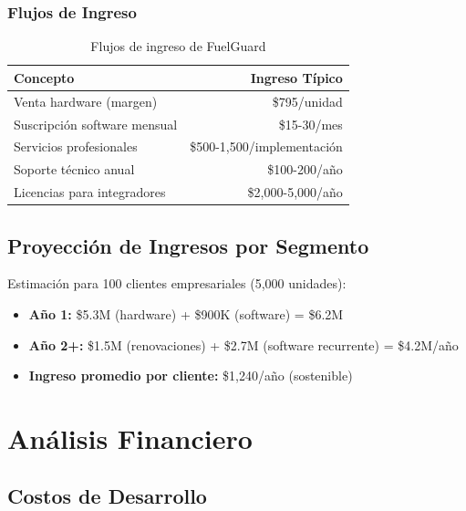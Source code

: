 \documentclass[12pt,a4paper,oneside]{report}
\begin{document}
\subsection{Flujos de Ingreso}

\begin{table}[H]
    \centering
    \begin{tabular}{|l|r|}
        \hline
        \textbf{Concepto} & \textbf{Ingreso Típico} \\
        \hline
        Venta hardware (margen) & \$795/unidad \\
        Suscripción software mensual & \$15-30/mes \\
        Servicios profesionales & \$500-1,500/implementación \\
        Soporte técnico anual & \$100-200/año \\
        Licencias para integradores & \$2,000-5,000/año \\
        \hline
    \end{tabular}
    \caption{Flujos de ingreso de FuelGuard}
\end{table}

\section{Proyección de Ingresos por Segmento}

Estimación para 100 clientes empresariales (5,000 unidades):

\begin{itemize}
    \item \textbf{Año 1:} \$5.3M (hardware) + \$900K (software) = \$6.2M
    \item \textbf{Año 2+:} \$1.5M (renovaciones) + \$2.7M (software recurrente) = \$4.2M/año
    \item \textbf{Ingreso promedio por cliente:} \$1,240/año (sostenible)
\end{itemize}

\chapter{Análisis Financiero}

\section{Costos de Desarrollo}
\end{document}
